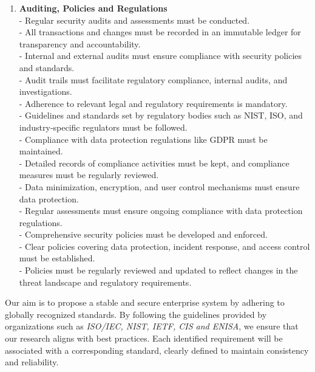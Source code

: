 \begin{enumerate}[label=(\arabic*)]
	\item\textbf{Auditing, Policies and Regulations}\\
	- Regular security audits and assessments must be conducted.\\
	- All transactions and changes must be recorded in an immutable ledger for transparency and accountability.\\
	- Internal and external audits must ensure compliance with security policies and standards.\\
	- Audit trails must facilitate regulatory compliance, internal audits, and investigations.\\
	- Adherence to relevant legal and regulatory requirements is mandatory.\\
	- Guidelines and standards set by regulatory bodies such as NIST, ISO, and industry-specific regulators must be followed.\\
	- Compliance with data protection regulations like GDPR must be maintained.\\
	- Detailed records of compliance activities must be kept, and compliance measures must be regularly reviewed.\\
	- Data minimization, encryption, and user control mechanisms must ensure data protection.\\
	- Regular assessments must ensure ongoing compliance with data protection regulations.\\
	- Comprehensive security policies must be developed and enforced.\\
	- Clear policies covering data protection, incident response, and access control must be established.\\
	- Policies must be regularly reviewed and updated to reflect changes in the threat landscape and regulatory requirements.\\
\end{enumerate}

Our aim is to propose a stable and secure enterprise system by adhering to globally recognized standards. By following the guidelines provided by organizations such as \textit{ISO/IEC, NIST, IETF, CIS and ENISA}, we ensure that our research aligns with best practices. Each identified requirement will be associated with a corresponding standard, clearly defined to maintain consistency and reliability.

\newpage